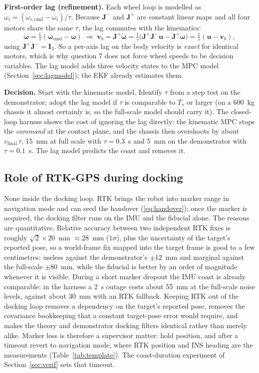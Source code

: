 \documentclass[11pt,a4paper]{article}
\newcommand{\vect}[1]{\bm{#1}}
\newcommand{\mat}[1]{\bm{#1}}
\newcommand{\Ts}{T_s}
\begin{document}
\textbf{First-order lag (refinement).} Each wheel loop is modelled as $\dot\omega_i = (\omega_{i,\mathrm{cmd}}-\omega_i)/\tau$. Because $\mat J^{-}$ and $\mat J^{+}$ are constant linear maps and all four motors share the same $\tau$, the lag commutes with the kinematics:
\begin{equation}
\dot{\vect\omega} = \tfrac{1}{\tau}(\vect\omega_{\mathrm{cmd}}-\vect\omega)
\;\Rightarrow\;
\dot{\vect v}_b = \mat J^{+}\dot{\vect\omega} = \tfrac{1}{\tau}\big(\mat J^{+}\mat J^{-}\vect u - \mat J^{+}\vect\omega\big) = \tfrac{1}{\tau}(\vect u-\vect v_b),
\end{equation}
using $\mat J^{+}\mat J^{-}=\mat I_3$. So a per-axis lag on the body velocity is \emph{exact} for identical motors, which is why question 7 does not force wheel speeds to be decision variables. The lag model adds three velocity states to the MPC model (Section~\ref{sec:lagmodel}); the EKF already estimates them.

\textbf{Decision.} Start with the kinematic model. Identify $\tau$ from a step test on the demonstrator; adopt the lag model if $\tau$ is comparable to $\Ts$ or larger (on a 600~kg chassis it almost certainly is, so the full-scale model should carry it). The closed-loop harness shows the cost of ignoring the lag directly: the kinematic MPC stops the \emph{command} at the contact plane, and the chassis then overshoots by about $v_{\mathrm{final}}\,\tau$, 15~mm at full scale with $\tau = 0.3$~s and 5~mm on the demonstrator with $\tau = 0.1$~s. The lag model predicts the coast and removes it.

\subsection{Role of RTK-GPS during docking}
\label{sec:gpsrole}

None inside the docking loop. RTK brings the robot into marker range in navigation mode and can seed the handover (\ref{eq:handover}); once the marker is acquired, the docking filter runs on the IMU and the fiducial alone. The reasons are quantitative. Relative accuracy between two independent RTK fixes is roughly $\sqrt{2}\times 20$~mm $\approx 28$~mm ($1\sigma$), plus the uncertainty of the target's reported pose, so a world-frame fix mapped into the target frame is good to a few centimetres: useless against the demonstrator's $\pm 12$~mm and marginal against the full-scale $\pm 80$~mm, while the fiducial is better by an order of magnitude whenever it is visible. During a short marker dropout the IMU coast is already comparable: in the harness a 2~s outage costs about 55~mm at the full-scale noise levels, against about 30~mm with an RTK fallback. Keeping RTK out of the docking loop removes a dependency on the target's reported pose, removes the covariance bookkeeping that a constant target-pose error would require, and makes the theory and demonstrator docking filters identical rather than merely alike. Marker loss is therefore a supervisor matter: hold position, and after a timeout revert to navigation mode, where RTK position and INS heading are the measurements (Table~\ref{tab:template}). The coast-duration experiment of Section~\ref{sec:verif} sets that timeout.
\end{document}
